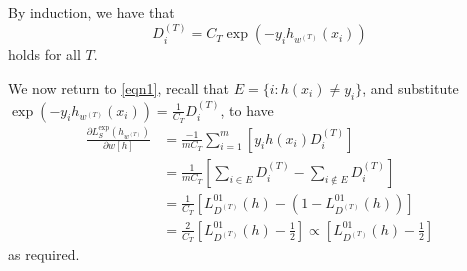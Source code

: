 \documentclass[a4paper, 10pt]{article}
\begin{document}
\begin{problem}
    By induction, we have that \begin{equation*}
    D_i^{(T)} = C_T \exp(-y_i h_{w^{(T)}}(x_i))
    \end{equation*}
    holds for all $T$.

    We now return to \eqref{eqn1}, recall that $E = \{i : h(x_i) \neq y_i\}$, and substitute $\exp(-y_i h_{w^{(T)}}(x_i)) = \frac{1}{C_T} D_i^{(T)}$, to have
    \begin{align*}
    \frac{\partial L_S^{\exp}(h_{w^{(T)}})}{\partial w[h]} &= \frac{-1}{mC_T} \sum_{i=1}^{m} \left[y_i h(x_i) D_i^{(T)}\right] \\
    &= \frac{1}{mC_T} \left[\sum_{i \in E} D_i^{(T)} - \sum_{i \not \in E} D_i^{(T)}\right] \\
    &= \frac{1}{C_T} \left[L^{01}_{D^{(T)}}(h) - (1 - L^{01}_{D^{(T)}}(h))\right] \\
    &= \frac{2}{C_T} \left[L^{01}_{D^{(T)}}(h) - \frac{1}{2}\right] \propto \left[L^{01}_{D^{(T)}}(h) - \frac{1}{2}\right] 
    \end{align*}
    as required.
\end{problem}
\end{document}
